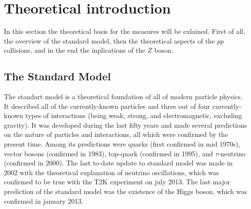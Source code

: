 \chapter{Theoretical introduction}
\label{sec:Theory}

In this section the theoretical basis for the measures will be exlained. First of all, the overview of the standard model, then the theoretical aspects of the $pp$ collisions, and in the end the inplications of the $Z$ boson.

\section{The Standard Model}
\label{sec:theory_SM}

The standart model is a theoretical foundation of all of modern particle physics. It described all of the currently-known particles and three out of four currently-known types of interactions (being weak, strong, and electromagnetic, excluding gravity). It was developed during the last fifty years and made several predictions on the nature of particles and interactions, all which were confirmed by the present time. Among its predictions were quarks (first confirmed in mid 1970s), vector bosons (confirmed in 1983), top-quark (confirmed in 1995), and $\tau$-neutrino (confirmed in 2000). The last to-date update to standard model was made in 2002 with the theoretical explanation of neutrino oscillations, which was confirmed to be true with the T2K experiment on july 2013. The last major prediction of the standard model was the existence of the Higgs boson, which was confirmed in january 2013.


